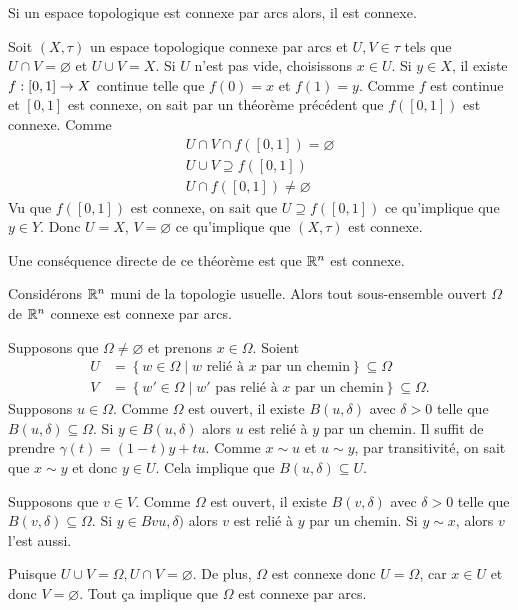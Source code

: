 \documentclass[french]{article}
\begin{document}
\begin{theoreme}
  Si un espace topologique est connexe par arcs alors, il est connexe.

  \tcblower
  \begin{preuve}
    Soit $(X, \tau)$ un espace topologique connexe par arcs et $U, V \in \tau$ tels que $U \cap V = \varnothing$ et $U \cup V = X$. Si $U$ n'est pas vide, choisissons $x \in U$. Si $y \in X$, il existe $f: [0, 1] \rightarrow X$ continue telle que $f(0) = x$ et $f(1) = y$. Comme   $f$ est continue et $[0, 1]$ est connexe, on sait par un théorème précédent que $f([0, 1])$ est connexe. Comme
    \begin{align*}
      U \cap V \cap f([0, 1]) = \varnothing \\
      U \cup V \supseteq f([0,1]) \\
      U \cap f([0, 1]) \not = \varnothing
    \end{align*}
    Vu que  $f\left( [0, 1] \right) $ est connexe, on sait que $U \supseteq f([0, 1])$ ce qu'implique que $y \in Y$. Donc $U = X$, $V = \varnothing $ ce qu'implique que $(X, \tau)$ est connexe.
  \end{preuve}
\end{theoreme}
Une conséquence directe de ce théorème est que $\mathbb{R}^n$ est connexe.

\begin{theoreme}
  Considérons $\mathbb{R}^n$ muni de la topologie usuelle. Alors tout sous-ensemble ouvert $\Omega$ de $\mathbb{R}^n$ connexe est connexe par arcs.

  \tcblower
  \begin{preuve}
    Supposons que $\Omega \not = \varnothing$ et prenons $x \in \Omega$. Soient
    \begin{align*}
      U &= \left\{ w \in \Omega \mid w \text{ relié à $x$ par un chemin}  \right\} \subseteq \Omega \\
      V &= \left\{ w' \in \Omega \mid w' \text{ pas relié à $x$ par un chemin} \right\} \subseteq \Omega.
    \end{align*}
    Supposons $u \in \Omega$. Comme $ \Omega$ est ouvert, il existe $B(u, \delta)$ avec $\delta > 0$ telle que  $B(u, \delta) \subseteq \Omega$. Si $y \in B(u, \delta)$ alors $u$ est relié à $y$ par un chemin. Il suffit de prendre $\gamma(t) = (1-t)y + tu$. Comme  $x \sim u$ et $u \sim y$, par transitivité, on sait que $x \sim y$ et donc $y \in U$. Cela implique que $B(u, \delta) \subseteq U$.
    \par Supposons que $v \in V$. Comme $ \Omega$ est ouvert, il existe $B(v, \delta)$ avec $\delta > 0$ telle que  $B(v, \delta) \subseteq \Omega$. Si $y \in Bvu, \delta)$ alors $v$ est relié à $y$ par un chemin. Si $y \sim x$, alors $v$ l'est aussi.
    \par Puisque $U \cup V = \Omega, U \cap V = \varnothing $. De plus, $\Omega$ est connexe donc $U = \Omega$, car $x \in U$ et donc $V= \varnothing $. Tout ça implique que $\Omega$ est connexe par arcs.
  \end{preuve}
\end{theoreme}
\end{document}
